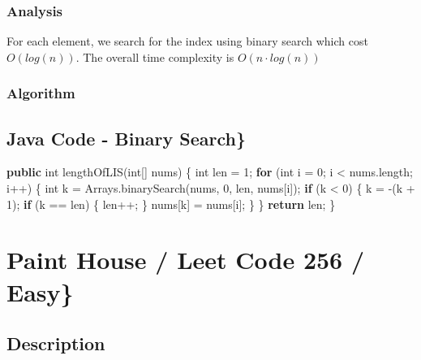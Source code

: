 \documentclass[]{book}
\newenvironment{Shaded}{\begin{snugshade}}{\end{snugshade}}
\newcommand{\BuiltInTok}[1]{#1}
\newcommand{\DataTypeTok}[1]{\textcolor[rgb]{0.13,0.29,0.53}{#1}}
\newcommand{\DecValTok}[1]{\textcolor[rgb]{0.00,0.00,0.81}{#1}}
\newcommand{\FunctionTok}[1]{\textcolor[rgb]{0.00,0.00,0.00}{#1}}
\newcommand{\KeywordTok}[1]{\textcolor[rgb]{0.13,0.29,0.53}{\textbf{#1}}}
\newcommand{\NormalTok}[1]{#1}
\begin{document}
\hypertarget{analysis-31}{%
\subsubsection{Analysis}\label{analysis-31}}

For each element, we search for the index using binary search which cost \(O(log(n))\). The overall time complexity is
\(O(n \cdot log(n))\)

\hypertarget{algorithm-31}{%
\subsubsection{Algorithm}\label{algorithm-31}}

\hypertarget{java-code---binary-search}{%
\subsection{Java Code - Binary Search\}}\label{java-code---binary-search}}

\begin{Shaded}
\begin{Highlighting}[]
\KeywordTok{public} \DataTypeTok{int} \FunctionTok{lengthOfLIS}\NormalTok{(}\DataTypeTok{int}\NormalTok{[] nums) \{}
    \DataTypeTok{int}\NormalTok{ len = }\DecValTok{1}\NormalTok{;}
    \KeywordTok{for}\NormalTok{ (}\DataTypeTok{int}\NormalTok{ i = }\DecValTok{0}\NormalTok{; i < nums.}\FunctionTok{length}\NormalTok{; i++) \{}
        \DataTypeTok{int}\NormalTok{ k = }\BuiltInTok{Arrays}\NormalTok{.}\FunctionTok{binarySearch}\NormalTok{(nums, }\DecValTok{0}\NormalTok{, len, nums[i]);}
        \KeywordTok{if}\NormalTok{ (k < }\DecValTok{0}\NormalTok{) \{}
\NormalTok{            k = -(k + }\DecValTok{1}\NormalTok{);}
            \KeywordTok{if}\NormalTok{ (k == len) \{}
\NormalTok{                len++;}
\NormalTok{            \}}
\NormalTok{            nums[k] = nums[i];}
\NormalTok{        \}}
\NormalTok{    \}}
    \KeywordTok{return}\NormalTok{ len;}
\NormalTok{\}}
\end{Highlighting}
\end{Shaded}

\hypertarget{paint-house-leet-code-256-easy}{%
\section{Paint House / Leet Code 256 / Easy\}}\label{paint-house-leet-code-256-easy}}

\hypertarget{description-30}{%
\subsection{Description}\label{description-30}}
\end{document}
